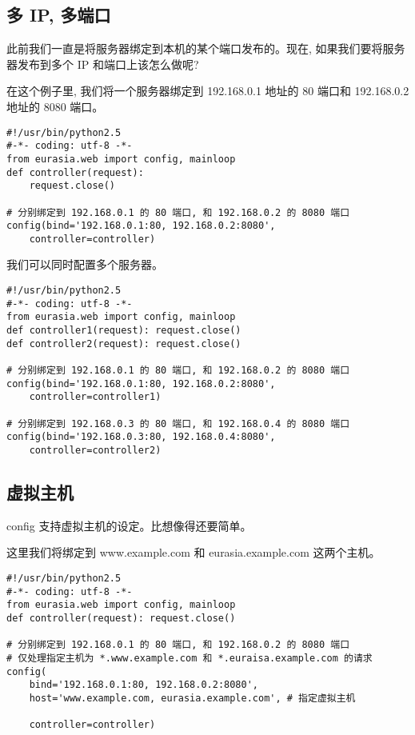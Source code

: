 \documentclass{manual}
\begin{document}
\subsection{多 IP, 多端口}

此前我们一直是将服务器绑定到本机的某个端口发布的。现在, 如果我们要将服务器发布到多个 IP 和端口上该怎么做呢?

在这个例子里, 我们将一个服务器绑定到 192.168.0.1 地址的 80 端口和 192.168.0.2 地址的 8080 端口。

\begin{verbatim}
#!/usr/bin/python2.5
#-*- coding: utf-8 -*-
from eurasia.web import config, mainloop
def controller(request):
	request.close()

# 分别绑定到 192.168.0.1 的 80 端口, 和 192.168.0.2 的 8080 端口
config(bind='192.168.0.1:80, 192.168.0.2:8080',
	controller=controller)
\end{verbatim}

我们可以同时配置多个服务器。

\begin{verbatim}
#!/usr/bin/python2.5
#-*- coding: utf-8 -*-
from eurasia.web import config, mainloop
def controller1(request): request.close()
def controller2(request): request.close()

# 分别绑定到 192.168.0.1 的 80 端口, 和 192.168.0.2 的 8080 端口
config(bind='192.168.0.1:80, 192.168.0.2:8080',
	controller=controller1)

# 分别绑定到 192.168.0.3 的 80 端口, 和 192.168.0.4 的 8080 端口
config(bind='192.168.0.3:80, 192.168.0.4:8080',
	controller=controller2)

\end{verbatim}




\subsection{虚拟主机}

config 支持虚拟主机的设定。比想像得还要简单。

这里我们将绑定到 www.example.com 和 eurasia.example.com 这两个主机。

\begin{verbatim}
#!/usr/bin/python2.5
#-*- coding: utf-8 -*-
from eurasia.web import config, mainloop
def controller(request): request.close()

# 分别绑定到 192.168.0.1 的 80 端口, 和 192.168.0.2 的 8080 端口
# 仅处理指定主机为 *.www.example.com 和 *.euraisa.example.com 的请求
config(
	bind='192.168.0.1:80, 192.168.0.2:8080',
	host='www.example.com, eurasia.example.com', # 指定虚拟主机

	controller=controller)
\end{verbatim}
\end{document}
